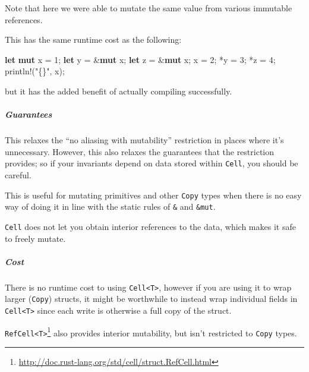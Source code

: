 \documentclass[a4paper,]{book}
\newenvironment{Shaded}{\begin{snugshade}}{\end{snugshade}}
\newcommand{\KeywordTok}[1]{\textcolor[rgb]{0.13,0.29,0.53}{\textbf{{#1}}}}
\newcommand{\DecValTok}[1]{\textcolor[rgb]{0.00,0.00,0.81}{{#1}}}
\newcommand{\StringTok}[1]{\textcolor[rgb]{0.31,0.60,0.02}{{#1}}}
\newcommand{\OtherTok}[1]{\textcolor[rgb]{0.56,0.35,0.01}{{#1}}}
\newcommand{\NormalTok}[1]{{#1}}
\renewcommand{\href}[2]{#2\footnote{\url{#1}}}
\let\oldsubparagraph\subparagraph
\renewcommand{\subparagraph}[1]{\oldsubparagraph{#1}\mbox{}}
\begin{document}
Note that here we were able to mutate the same value from various
immutable references.

This has the same runtime cost as the following:

\begin{Shaded}
\begin{Highlighting}[]
\KeywordTok{let} \KeywordTok{mut} \NormalTok{x = }\DecValTok{1}\NormalTok{;}
\KeywordTok{let} \NormalTok{y = &}\KeywordTok{mut} \NormalTok{x;}
\KeywordTok{let} \NormalTok{z = &}\KeywordTok{mut} \NormalTok{x;}
\NormalTok{x = }\DecValTok{2}\NormalTok{;}
\NormalTok{*y = }\DecValTok{3}\NormalTok{;}
\NormalTok{*z = }\DecValTok{4}\NormalTok{;}
\OtherTok{println!}\NormalTok{(}\StringTok{"\{\}"}\NormalTok{, x);}
\end{Highlighting}
\end{Shaded}

but it has the added benefit of actually compiling successfully.

\subparagraph{Guarantees}\label{guarantees-1}

This relaxes the ``no aliasing with mutability'' restriction in places
where it's unnecessary. However, this also relaxes the guarantees that
the restriction provides; so if your invariants depend on data stored
within \texttt{Cell}, you should be careful.

This is useful for mutating primitives and other \texttt{Copy} types
when there is no easy way of doing it in line with the static rules of
\texttt{\&} and \texttt{\&mut}.

\texttt{Cell} does not let you obtain interior references to the data,
which makes it safe to freely mutate.

\subparagraph{Cost}\label{cost-1}

There is no runtime cost to using
\texttt{Cell\textless{}T\textgreater{}}, however if you are using it to
wrap larger (\texttt{Copy}) structs, it might be worthwhile to instead
wrap individual fields in \texttt{Cell\textless{}T\textgreater{}} since
each write is otherwise a full copy of the struct.


\href{http://doc.rust-lang.org/std/cell/struct.RefCell.html}{\texttt{RefCell\textless{}T\textgreater{}}}
also provides interior mutability, but isn't restricted to \texttt{Copy}
types.
\end{document}
